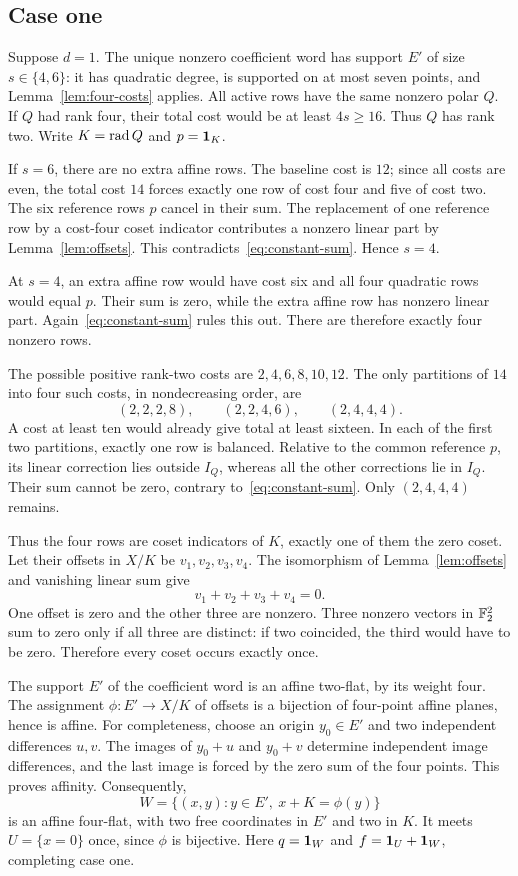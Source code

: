 \subsection{Case one}
Suppose $d=1$. The unique nonzero coefficient word has support $E'$ of size $s\in\{4,6\}$: it has quadratic degree, is supported on at most seven points, and Lemma~\ref{lem:four-costs} applies. All active rows have the same nonzero polar $Q$. If $Q$ had rank four, their total cost would be at least $4s\ge16$. Thus $Q$ has rank two. Write $K=\operatorname{rad} Q$ and $p=\mathbf 1_K$.

If $s=6$, there are no extra affine rows. The baseline cost is $12$; since all costs are even, the total cost $14$ forces exactly one row of cost four and five of cost two. The six reference rows $p$ cancel in their sum. The replacement of one reference row by a cost-four coset indicator contributes a nonzero linear part by Lemma~\ref{lem:offsets}. This contradicts~\eqref{eq:constant-sum}. Hence $s=4$.

At $s=4$, an extra affine row would have cost six and all four quadratic rows would equal $p$. Their sum is zero, while the extra affine row has nonzero linear part. Again~\eqref{eq:constant-sum} rules this out. There are therefore exactly four nonzero rows.

The possible positive rank-two costs are $2,4,6,8,10,12$. The only partitions of $14$ into four such costs, in nondecreasing order, are
\[
(2,2,2,8),\qquad (2,2,4,6),\qquad (2,4,4,4).
\]
A cost at least ten would already give total at least sixteen. In each of the first two partitions, exactly one row is balanced. Relative to the common reference $p$, its linear correction lies outside $I_Q$, whereas all the other corrections lie in $I_Q$. Their sum cannot be zero, contrary to~\eqref{eq:constant-sum}. Only $(2,4,4,4)$ remains.

Thus the four rows are coset indicators of $K$, exactly one of them the zero coset. Let their offsets in $X/K$ be $v_1,v_2,v_3,v_4$. The isomorphism of Lemma~\ref{lem:offsets} and vanishing linear sum give
\[
v_1+v_2+v_3+v_4=0.
\]
One offset is zero and the other three are nonzero. Three nonzero vectors in $\mathbb F_2^2$ sum to zero only if all three are distinct: if two coincided, the third would have to be zero. Therefore every coset occurs exactly once.

The support $E'$ of the coefficient word is an affine two-flat, by its weight four. The assignment $\phi\colon E'\to X/K$ of offsets is a bijection of four-point affine planes, hence is affine. For completeness, choose an origin $y_0\in E'$ and two independent differences $u,v$. The images of $y_0+u$ and $y_0+v$ determine independent image differences, and the last image is forced by the zero sum of the four points. This proves affinity. Consequently,
\[
W=\{(x,y):y\in E',\ x+K=\phi(y)\}
\]
is an affine four-flat, with two free coordinates in $E'$ and two in $K$. It meets $U=\{x=0\}$ once, since $\phi$ is bijective. Here $q=\mathbf 1_W$ and $f=\mathbf 1_U+\mathbf 1_W$, completing case one.

